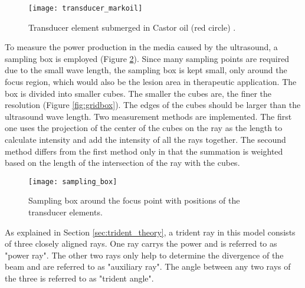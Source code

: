 \begin{figure}[h]
    \centering
    \texttt{[image: transducer\_markoil]}
    \caption{Transducer element submerged in Castor oil (red circle) \cite{sonalleve} \cite{vanwijk2013}.}
    \label{fig:submerged_transducer}
\end{figure}

To measure the power production in the media caused by the ultrasound, a sampling box is employed (Figure \ref{fig:sampling_box}). Since many sampling points are required due to the small wave length, the sampling box is kept small, only around the focus region, which would also be the lesion area in therapeutic application. The box is divided into smaller cubes. The smaller the cubes are, the finer the resolution (Figure \ref{fig:gridbox}). The edges of the cubes should be larger than the ultrasound wave length. Two measurement methods are implemented. The first one uses the projection of the center of the cubes on the ray as the length to calculate intensity and add the intensity of all the rays together. The secound method differs from the first method only in that the summation is weighted based on the length of the intersection of the ray with the cubes.

\begin{figure}[h]
    \centering
    \texttt{[image: sampling\_box]}
    \caption{Sampling box around the focus point with positions of the transducer elements.}
    \label{fig:sampling_box}
\end{figure}

As explained in Section \ref{sec:trident_theory}, a trident ray in this model consists of three closely aligned rays. One ray carrys the power and is referred to as "power ray". The other two rays only help to determine the divergence of the beam and are referred to as "auxiliary ray". The angle between any two rays of the three is referred to as "trident angle".

